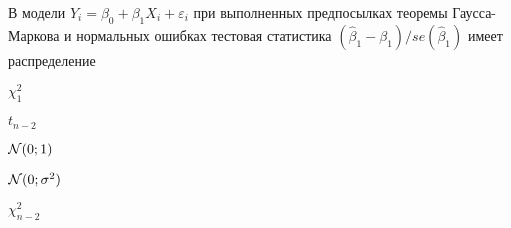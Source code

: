 
\begin{question}
В модели \(Y_i = \beta_0 + \beta_1 X_i + \varepsilon_i\) при выполненных
предпосылках теоремы Гаусса-Маркова и нормальных ошибках тестовая
статистика \((\hat\beta_1 - \beta_1)/se(\hat\beta_1)\) имеет
распределение
\begin{answerlist}
  \item \(\chi^2_1\)
  \item \(t_{n-2}\)
  \item \(\mathcal{N}(0;1)\)
  \item \(\mathcal{N}(0;\sigma^2)\)
  \item \(\chi^2_{n-2}\)
\end{answerlist}
\end{question}



